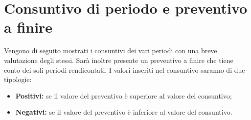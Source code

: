 \section{Consuntivo di periodo e preventivo a finire}
\label{consuntivo_preventivo_a_finire}
Vengono di seguito mostrati i consuntivi dei vari periodi con una breve valutazione degli stessi. Sarà inoltre presente un preventivo a finire che tiene conto dei soli periodi rendicontati. I valori inseriti nel consuntivo saranno di due tipologie:
\begin{itemize}
	\item \textbf{Positivi:} se il valore del preventivo è superiore al valore del consuntivo;
	\item \textbf{Negativi:} se il valore del preventivo è inferiore al valore del consuntivo.
\end{itemize}




